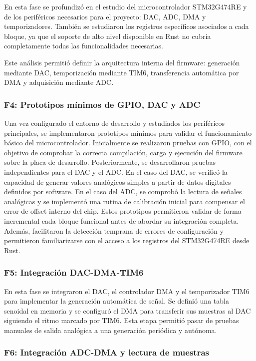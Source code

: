 \documentclass[11pt,a4paper]{article}
\begin{document}
En esta fase se profundizó en el estudio del microcontrolador STM32G474RE y de los periféricos necesarios para el proyecto: DAC, ADC, DMA y temporizadores. También se estudiaron los registros específicos asociados a cada bloque, ya que el soporte de alto nivel disponible en Rust no cubría completamente todas las funcionalidades necesarias.

Este análisis permitió definir la arquitectura interna del firmware: generación mediante DAC, temporización mediante TIM6, transferencia automática por DMA y adquisición mediante ADC.


\subsubsection{F4: Prototipos mínimos de GPIO, DAC y ADC}

Una vez configurado el entorno de desarrollo y estudiados los periféricos principales, se implementaron prototipos mínimos para validar el funcionamiento básico del microcontrolador. Inicialmente se realizaron pruebas con GPIO, con el objetivo de comprobar la correcta compilación, carga y ejecución del firmware sobre la placa de desarrollo.
Posteriormente, se desarrollaron pruebas independientes para el DAC y el ADC. En el caso del DAC, se verificó la capacidad de generar valores analógicos simples a partir de datos digitales definidos por software. En el caso del ADC, se comprobó la lectura de señales analógicas y se implementó una rutina de calibración inicial para compensar el error de offset interno del chip.
Estos prototipos permitieron validar de forma incremental cada bloque funcional antes de abordar su integración completa. Además, facilitaron la detección temprana de errores de configuración y permitieron familiarizarse con el acceso a los registros del STM32G474RE desde Rust.


\subsubsection{F5: Integración DAC-DMA-TIM6}

En esta fase se integraron el DAC, el controlador DMA y el temporizador TIM6 para implementar la generación automática de señal. Se definió una tabla senoidal en memoria y se configuró el DMA para transferir sus muestras al DAC siguiendo el ritmo marcado por TIM6. Esta etapa permitió pasar de pruebas manuales de salida analógica a una generación periódica y autónoma.


\subsubsection{F6: Integración ADC-DMA y lectura de muestras}
\end{document}
